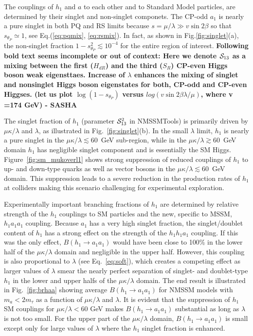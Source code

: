 \documentclass[aps,prl,nofootinbib,superscriptaddress]{revtex4}
\def\SC{{\cal S}}
\begin{document}
The couplings of $h_1$ and $a$ to each other and to Standard Model particles, are determined by their 
singlet and non-singlet componets. The CP-odd $a_1$ is nearly a pure singlet in both PQ and RS limits 
because $s=\mu/\lambda\gg v\sin 2\beta$ so that $s_{\theta_P} \simeq 1$, see Eq.(\ref{eq:pqmix}, \ref{eq:rsmix}). 
In fact, as shown in Fig.\ref{fig:singlet}(a), the non-singlet fraction $1-s_{\theta_P}^2  \lesssim 10^{-4}$ for 
the entire region of interest. {\bf Following bold text seems incomplete or out of context: Here we 
denote  $\SC_{13}$ as a mixing between the first ($H_{dR}$)
and  the third ($S_{R}$) CP-even Higgs boson weak eigensttaes.  
Increase of $\lambda$  enhances the  mixing of singlet and nonsinglet
Higgs boson eigenstates for both, CP-odd and CP-even Higgses. (let us plot  
$\log(1-s_{\theta_P})$ versus $log( v \sin 2\beta \lambda/\mu)$, where v =174 GeV) - SASHA}

The singlet fraction of $h_1$ (parameter $\SC_{13}^2$ in NMSSMTools) is primarily driven by 
$\mu\kappa/\lambda$ and $\lambda$, as illustrated in Fig.~\ref{fig:singlet}(b). 
In the small $\lambda$ limit, $h_1$ is nearly a pure singlet in the $\mu\kappa/\lambda \lesssim 60$~GeV
sub-region, while in the $\mu\kappa/\lambda \gtrsim 60$~GeV domain $h_1$ has negligible singlet component 
and is essentially the SM Higgs. Figure~\ref{fig:sm_mukoverl1} shows strong suppression of reduced couplings 
of $h_1$ to up- and down-type quarks as well as vector bosons in the $\mu\kappa/\lambda \lesssim 60$~GeV 
domain. This suppression leads to a severe reduction in the production rates of $h_1$ at colliders 
making this scenario challenging for experimental exploration.

Experimentally important branching fractions of $h_1$ are determined by relative strength of 
the $h_1$ couplings to SM particles and the new, specific to MSSM, $h_1 a_1 a_1$ coupling. 
Because $a_1$ has a very high singlet fraction, the singlet/doublet content of $h_1$ has 
a strong effect on the strength of the $h_1 h_1 a_1$ coupling. If this was the only effect,
$B(h_1 \to a_1 a_1)$ would have been close to 100\% in the lower half of the $\mu\kappa/\lambda$
domain and negligible in the upper half. However, this coupling is also proportional to 
$\lambda$ (see Eq.~\ref{eq:soft}), which creates a competing effect as larger values of 
$\lambda$ smear the nearly perfect separation of singlet- and doublet-type $h_1$ in the lower
and upper halfs of the $\mu\kappa/\lambda$ domain. The end result is illustrated in 
Fig.~\ref{fig:brhaa} showing average $B(h_1 \to a_1 a_1)$ for NMSSM models with $m_a< 2m_\tau$ 
as a function of $\mu\kappa/\lambda$ and $\lambda$. It is evident that the suppression of $h_1$ 
SM couplings for $\mu\kappa/\lambda < 60$ GeV makes $B(h_1 \to a_1 a_1)$ substantial as long as 
$\lambda$ is not too small. For the upper part of the $\mu\kappa/\lambda$ domain, $B(h_1 \to a_1 a_1)$ 
is small except only for large values of $\lambda$ where the $h_1$ singlet fraction is enhanced.
\end{document}
